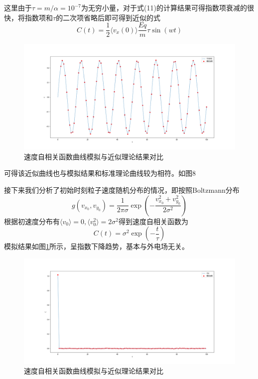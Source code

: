 \documentclass{article}
\begin{document}
这里由于$ \tau=m/\alpha=10^{-7} $为无穷小量，对于式(11)的计算结果可得指数项衰减的很快，将指数项和$ \tau $的二次项省略后即可得到近似的式
\begin{equation}
	C(t)=\frac{1}{2}\langle v_x(0)\rangle\frac{Eq}{m}\tau\sin(wt)
\end{equation}
\begin{figure}[!h]
	
	\centering
	\includegraphics[scale=0.4]{C_approx}
	\caption{\heiti{}速度自相关函数曲线模拟与近似理论结果对比}
	
\end{figure}
可得该近似曲线也与模拟结果和标准理论曲线较为相符。如图8


接下来我们分析了初始时刻粒子速度随机分布的情况，即按照Boltzmann分布
\begin{equation}
	g(v_{x_0},v_{y_0})=\frac{1}{2\pi\sigma}\exp(-\frac{v_{x_0}^2+v_{y_0}^2}{2\sigma^2})
\end{equation}
根据初速度分布有$ \langle v_{0}\rangle=0,\langle v_0^2\rangle=2\sigma^2 $得到速度自相关函数为
\begin{equation}
	C(t)=\sigma^2\exp(-\frac{t}{\tau})
\end{equation}
模拟结果如图\ref{fig:9}所示，呈指数下降趋势，基本与外电场无关。
\begin{figure}[!h]
	
	\centering
	\includegraphics[scale=0.4]{C_rand}
	\caption{\heiti{}速度自相关函数曲线模拟与近似理论结果对比}
	\label{fig:9}
\end{figure}
\end{document}
